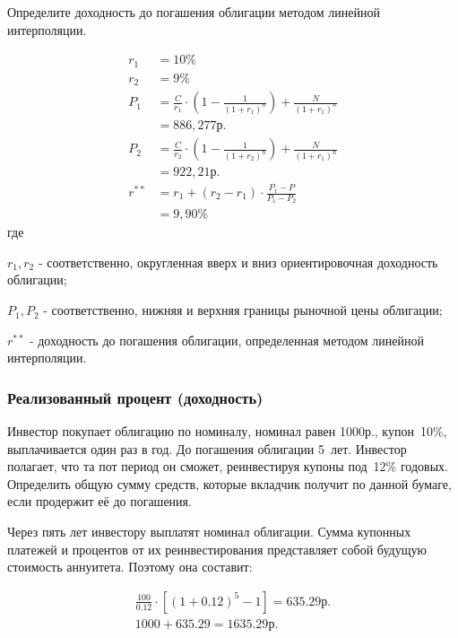 \documentclass[12pt, table, a4paper,twoside]{exam}
\begin{document}
\begin{questions}
\begin{subparts}
	\subpart[10] Определите доходность до погашения облигации методом линейной интерполяции.
	
	\begin{solution}[12em]
		\begin{align}
		r_1&=10\%\nonumber\\
		r_2&=9\%\nonumber\\
		P_1&=\frac{C}{r_1} \cdot \left(1 - \frac{1}{(1+r_1)^n} \right) + \frac{N}{(1+r_1)^n}\\
		&=886,277\text{р.}\nonumber\\
		P_2&=\frac{C}{r_2} \cdot \left(1 - \frac{1}{(1+r_2)^n} \right) + \frac{N}{(1+r_1)^n}\\
		&=922,21\text{р.}\nonumber\\
		r^{**}&=r_1+(r_2-r_1) \cdot \frac{P_1-P}{P_1-P_2}\\
		&=9,90\%\nonumber
		\end{align}	
		где
		
		$r_1, r_2$ - соответственно, округленная вверх и вниз ориентировочная доходность облигации;
		
		$P_1, P_2$ - соответственно, нижняя и верхняя границы рыночной цены облигации;
		
		$r^{**}$ - доходность до погашения облигации, определенная методом линейной интерполяции.
	\end{solution}
	
\end{subparts}
\addpoints




\subsubsection{Реализованный процент (доходность)}

\question[10] Инвестор покупает облигацию по номиналу, номинал равен 1000р., купон~10\%, выплачивается один раз в год. До погашения облигации 5~лет. Инвестор полагает, что та пот период он сможет, реинвестируя купоны под~12\% годовых. Определить общую сумму средств, которые вкладчик получит по данной бумаге, если продержит её до погашения. 

\begin{solution}[12em]
	
	\raggedright
	Через пять лет инвестору выплатят номинал облигации. Сумма купонных платежей и процентов от их реинвестирования представляет собой будущую стоимость аннуитета. Поэтому она составит:
	
	\begin{align*}
	\frac{100}{0.12} \cdot \left[(1+0.12)^5 - 1 \right] = 635.29\text{р.}\\
	1000+635.29 = 1635.29\text{р.}
	\end{align*}
\end{solution}



\end{questions}
\end{document}

